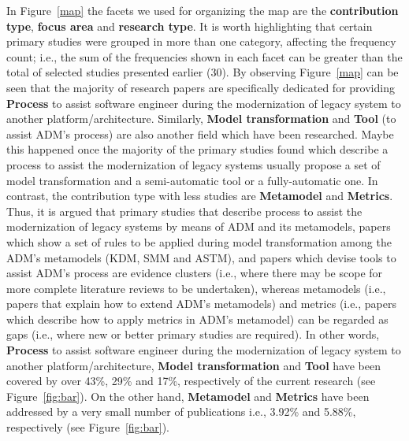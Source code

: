 In Figure~\ref{map} the facets we used for organizing the map are the \textbf{contribution type}, \textbf{focus area} and \textbf{research type}. It is worth highlighting that certain primary studies were grouped in more than one category, affecting the frequency count; i.e., the sum of the frequencies shown in each facet can be greater than the total of selected studies presented earlier (30). By observing Figure~\ref{map} can be seen that the majority of research papers are specifically dedicated for providing \textbf{Process} to assist software engineer during the modernization of legacy system to another platform/architecture. Similarly, \textbf{Model transformation} and \textbf{Tool} (to assist ADM's process) are also another field which have been researched. Maybe this happened once the majority of the primary studies found which describe a process to assist the modernization of legacy systems usually propose a set of model transformation and a semi-automatic tool or a fully-automatic one. In contrast, the contribution type with less studies are \textbf{Metamodel} and \textbf{Metrics}. Thus, it is argued that primary studies that describe process to assist the modernization of legacy systems by means of ADM and its metamodels, papers which show a set of rules to be applied during model transformation among the ADM's metamodels (KDM, SMM and ASTM), and papers which devise tools to assist ADM's process are evidence clusters (i.e., where there may be scope for more complete literature reviews to be undertaken), whereas metamodels (i.e., papers that explain how to extend ADM's metamodels) and metrics (i.e., papers which describe how to apply metrics in ADM's metamodel) can be regarded as gaps (i.e., where new or better primary studies are required). In other words, \textbf{Process} to assist software engineer during the modernization of legacy system to another platform/architecture, \textbf{Model transformation} and \textbf{Tool} have been covered by over 43\%, 29\% and 17\%, respectively of the current research (see Figure~\ref{fig:bar}). On the other hand, \textbf{Metamodel} and \textbf{Metrics} have been addressed by a very small number of publications i.e., 3.92\% and 5.88\%, respectively (see Figure~\ref{fig:bar}).   %

% 
 
